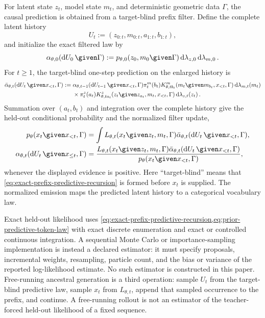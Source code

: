 For latent state $z_t$, model state $m_t$, and deterministic geometric data $\Gamma$, the causal prediction is obtained from a target-blind prefix filter. Define the complete latent history
\begin{equation}
U_t:=(z_{0:t},m_{0:t},a_{1:t},b_{1:t}),
\label{eq:prefix-latent-history}
\end{equation}
and initialize the exact filtered law by
\begin{equation}
\alpha_{\theta,0}(\mathop{\mathrm dU_0}\given\Gamma)
:=p_{\theta,0}(z_0,m_0\given\Gamma)
\mathop{\mathrm d\lambda_{z,0}}\mathop{\mathrm d\lambda_{m,0}}.
\label{eq:prefix-filter-initial-law}
\end{equation}
For $t\geq1$, the target-blind one-step prediction on the enlarged history is
\begin{equation}
\begin{aligned}
\bar\alpha_{\theta,t}(\mathop{\mathrm dU_t}\given x_{<t},\Gamma)
:={}&\alpha_{\theta,t-1}(\mathop{\mathrm dU_{t-1}}\given x_{<t},\Gamma)
\pi_t^m(b_t)
K^m_{\theta,tb_t}(m_t\given m_{b_t},x_{<t},\Gamma)
\mathop{\mathrm d\lambda_{m,t}(m_t)}\\
&\times\pi_t^z(a_t)
K^z_{\theta,ta_t}(z_t\given z_{a_t},m_t,x_{<t},\Gamma)
\mathop{\mathrm d\lambda_{z,t}(z_t)}.
\end{aligned}
\label{eq:exact-prefix-predictive-recursion}
\end{equation}
Summation over $(a_t,b_t)$ and integration over the complete history give the held-out conditional probability and the normalized filter update,
\begin{equation}
\begin{aligned}
p_\theta(x_t\given x_{<t},\Gamma)
&=\int L_{\theta,t}(x_t\given z_t,m_t,\Gamma)
\bar\alpha_{\theta,t}(\mathop{\mathrm dU_t}\given x_{<t},\Gamma),\\
\alpha_{\theta,t}(\mathop{\mathrm dU_t}\given x_{\leq t},\Gamma)
&=\frac{L_{\theta,t}(x_t\given z_t,m_t,\Gamma)
\bar\alpha_{\theta,t}(\mathop{\mathrm dU_t}\given x_{<t},\Gamma)}
{p_\theta(x_t\given x_{<t},\Gamma)},
\end{aligned}
\label{eq:prior-predictive-token-law}
\end{equation}
whenever the displayed evidence is positive. Here ``target-blind'' means that \cref{eq:exact-prefix-predictive-recursion} is formed before $x_t$ is supplied. The normalized emission maps the predicted latent history to a categorical vocabulary law.

Exact held-out likelihood uses \cref{eq:exact-prefix-predictive-recursion,eq:prior-predictive-token-law} with exact discrete enumeration and exact or controlled continuous integration. A sequential Monte Carlo or importance-sampling implementation is instead a declared estimator: it must specify proposals, incremental weights, resampling, particle count, and the bias or variance of the reported log-likelihood estimate. No such estimator is constructed in this paper. Free-running ancestral generation is a third operation: sample $U_t$ from the target-blind predictive law, sample $x_t$ from $L_{\theta,t}$, append that sampled occurrence to the prefix, and continue. A free-running rollout is not an estimator of the teacher-forced held-out likelihood of a fixed sequence.

